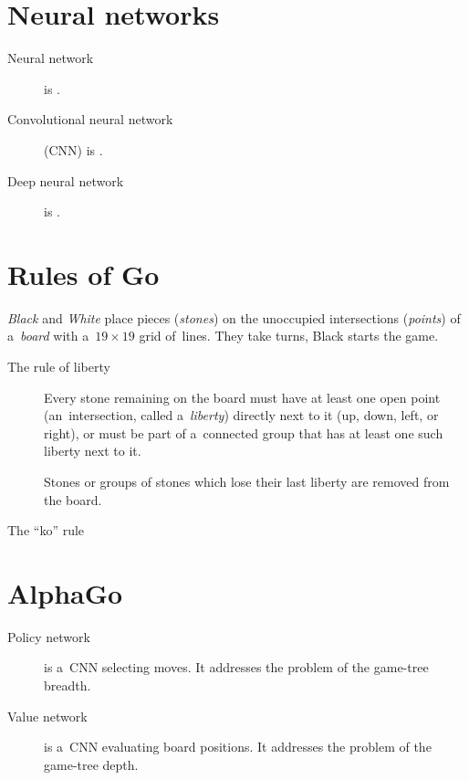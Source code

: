 \documentclass[a4paper,10pt]{article}
\begin{document}
\section{Neural networks}
\begin{description}
  \item [Neural network] is \todo.
  \item [Convolutional neural network] (CNN) is \todo.
  \item [Deep neural network] is \todo.
\end{description}

\section{Rules of Go}
\emph{Black} and \emph{White} place pieces (\emph{stones}) on the unoccupied intersections (\emph{points}) of a~\emph{board} with a~$19\times19$ grid of~lines.
They take turns, Black starts the game.
\begin{description}
  \item [The rule of liberty]
    Every stone remaining on the board must have at least one open point (an~intersection, called a~\emph{liberty}) directly next to it (up, down, left, or right), or must be part of a~connected group that has at least one such liberty next to it.

    Stones or groups of stones which lose their last liberty are removed from the board.

  \item [The ``ko'' rule]
    \todo
\end{description}

\section{AlphaGo}
\begin{description}
  \item [Policy network] is a~CNN selecting moves.
    It addresses the problem of the game-tree breadth.
  \item [Value network] is a~CNN evaluating board positions.
    It addresses the problem of the game-tree depth.
\end{description}
\end{document}
